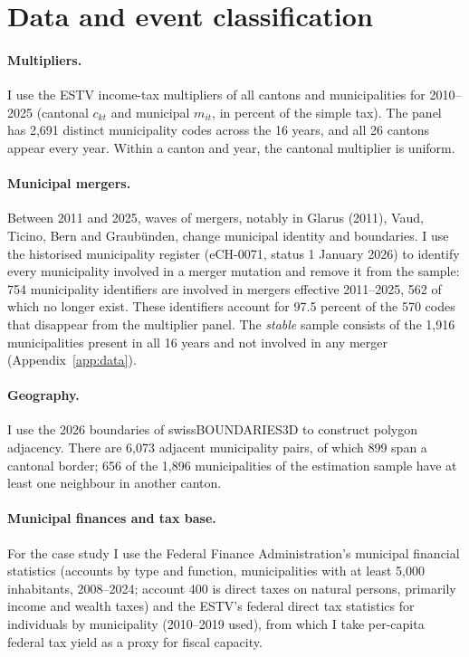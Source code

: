 \documentclass[11pt,a4paper]{article}
\begin{document}
\section{Data and event classification}\label{sec:data}

\paragraph{Multipliers.} I use the ESTV income-tax multipliers of all cantons and municipalities for 2010--2025 (cantonal $c_{kt}$ and municipal $m_{it}$, in percent of the simple tax). The panel has 2,691 distinct municipality codes across the 16 years, and all 26 cantons appear every year. Within a canton and year, the cantonal multiplier is uniform.

\paragraph{Municipal mergers.} Between 2011 and 2025, waves of mergers, notably in Glarus (2011), Vaud, Ticino, Bern and Graub\"unden, change municipal identity and boundaries. I use the historised municipality register (eCH-0071, status 1 January 2026) to identify every municipality involved in a merger mutation and remove it from the sample: 754 municipality identifiers are involved in mergers effective 2011--2025, 562 of which no longer exist. These identifiers account for 97.5 percent of the 570 codes that disappear from the multiplier panel. The \emph{stable} sample consists of the 1,916 municipalities present in all 16 years and not involved in any merger (Appendix~\ref{app:data}).

\paragraph{Geography.} I use the 2026 boundaries of swissBOUNDARIES3D to construct polygon adjacency. There are 6,073 adjacent municipality pairs, of which 899 span a cantonal border; 656 of the 1,896 municipalities of the estimation sample have at least one neighbour in another canton.

\paragraph{Municipal finances and tax base.} For the case study I use the Federal Finance Administration's municipal financial statistics (accounts by type and function, municipalities with at least 5,000 inhabitants, 2008--2024; account 400 is direct taxes on natural persons, primarily income and wealth taxes) and the ESTV's federal direct tax statistics for individuals by municipality (2010--2019 used), from which I take per-capita federal tax yield as a proxy for fiscal capacity.
\end{document}
